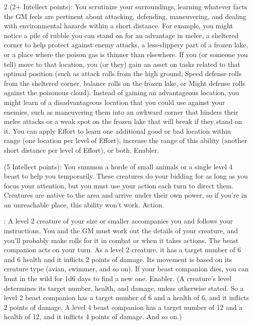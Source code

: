 \begin{multicols}{2}
 (2+ Intellect points): You scrutinize your surroundings, learning whatever facts the GM feels are pertinent about attacking, defending, maneuvering, and dealing with environmental hazards within a short distance. For example, you might notice a pile of rubble you can stand on for an advantage in melee, a sheltered corner to help protect against enemy attacks, a less-slippery part of a frozen lake, or a place where the poison gas is thinner than elsewhere. If you (or someone you tell) move to that location, you (or they) gain an asset on tasks related to that optimal position (such as attack rolls from the high ground, Speed defense rolls from the sheltered corner, balance rolls on the frozen lake, or Might defense rolls against the poisonous cloud). Instead of gaining an advantageous location, you might learn of a disadvantageous location that you could use against your enemies, such as maneuvering them into an awkward corner that hinders their melee attacks or a weak spot on the frozen lake that will break if they stand on it. You can apply Effort to learn one additional good or bad location within range (one location per level of Effort), increase the range of this ability (another short distance per level of Effort), or both. Enabler. 

 (5 Intellect points): You summon a horde of small animals or a single level 4 beast to help you temporarily. These creatures do your bidding for as long as you focus your attention, but you must use your action each turn to direct them. Creatures are native to the area and arrive under their own power, so if you’re in an unreachable place, this ability won’t work. Action. 

: A level 2 creature of your size or smaller accompanies you and follows your instructions. You and the GM must work out the details of your creature, and you’ll probably make rolls for it in combat or when it takes actions. The beast companion acts on your turn. As a level 2 creature, it has a target number of 6 and 6 health and it inflicts 2 points of damage. Its movement is based on its creature type (avian, swimmer, and so on). If your beast companion dies, you can hunt in the wild for 1d6 days to find a new one. Enabler. (A creature’s level determines its target number, health, and
damage, unless otherwise stated. So a level 2 beast companion has a target number of 6 and a health of 6, and it inflicts 2 points of damage. A level 4 beast companion has a target number of 12 and a health of 12, and it inflicts 4 points of damage. And so on.)


\end{multicols}
